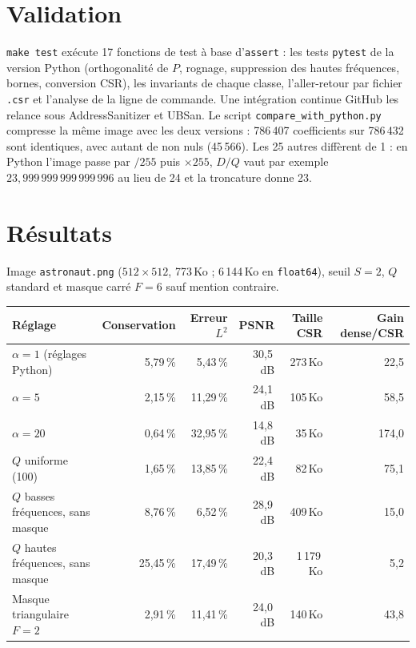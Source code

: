 \documentclass[10pt,a4paper]{article}
\newcommand{\code}[1]{\texttt{#1}}
\begin{document}
\section{Validation}
\code{make test} exécute 17 fonctions de test à base d'\code{assert} : les tests
\code{pytest} de la version Python (orthogonalité de $P$, rognage, suppression des
hautes fréquences, bornes, conversion CSR), les invariants de chaque classe,
l'aller-retour par fichier \code{.csr} et l'analyse de la ligne de commande. Une
intégration continue GitHub les relance sous AddressSanitizer et UBSan. Le script
\code{compare\_with\_python.py} compresse la même image avec les deux versions :
786\,407 coefficients sur 786\,432 sont identiques, avec autant de non nuls (45\,566).
Les 25 autres diffèrent de 1 : en Python l'image passe par $/255$ puis $\times 255$,
$D/Q$ vaut par exemple $23{,}999\,999\,999\,999\,996$ au lieu de 24 et la troncature
donne 23.

\section{Résultats}
Image \code{astronaut.png} ($512\times512$, 773\,Ko ; 6\,144\,Ko en \code{float64}),
seuil $S=2$, $Q$ standard et masque carré $F=6$ sauf mention contraire.

\begin{center}
{\small
\begin{tabular}{@{}lrrrrr@{}}
  \toprule
  Réglage & Conservation & Erreur $L^2$ & PSNR & Taille CSR & Gain dense/CSR \\
  \midrule
  $\alpha = 1$ (réglages Python) & 5,79\,\% & 5,43\,\% & 30,5\,dB & 273\,Ko & 22,5 \\
  $\alpha = 5$ & 2,15\,\% & 11,29\,\% & 24,1\,dB & 105\,Ko & 58,5 \\
  $\alpha = 20$ & 0,64\,\% & 32,95\,\% & 14,8\,dB & 35\,Ko & 174,0 \\
  $Q$ uniforme (100) & 1,65\,\% & 13,85\,\% & 22,4\,dB & 82\,Ko & 75,1 \\
  $Q$ basses fréquences, sans masque & 8,76\,\% & 6,52\,\% & 28,9\,dB & 409\,Ko & 15,0 \\
  $Q$ hautes fréquences, sans masque & 25,45\,\% & 17,49\,\% & 20,3\,dB & 1\,179\,Ko & 5,2 \\
  Masque triangulaire $F=2$ & 2,91\,\% & 11,41\,\% & 24,0\,dB & 140\,Ko & 43,8 \\
  \bottomrule
\end{tabular}}
\end{center}
\end{document}
